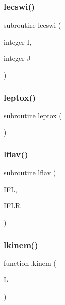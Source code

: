\subsubsection{\texorpdfstring{lecswi()}{lecswi()}}
{\footnotesize\ttfamily subroutine lecswi (\begin{DoxyParamCaption}\item[{integer}]{I,  }\item[{integer}]{J }\end{DoxyParamCaption})}

\mbox{\label{djangoh__l_8f_a11067b9bff6d66852c24584cdc303b3c}} 
\subsubsection{\texorpdfstring{leptox()}{leptox()}}
{\footnotesize\ttfamily subroutine leptox (\begin{DoxyParamCaption}{ }\end{DoxyParamCaption})}

\mbox{\label{djangoh__l_8f_a2f0e84e9b484d85d15f8ac53db3fc90c}} 
\subsubsection{\texorpdfstring{lflav()}{lflav()}}
{\footnotesize\ttfamily subroutine lflav (\begin{DoxyParamCaption}\item[{}]{I\+FL,  }\item[{}]{I\+F\+LR }\end{DoxyParamCaption})}

\mbox{\label{djangoh__l_8f_a504b2325591f13f341edbbbf8cc70bfa}} 
\subsubsection{\texorpdfstring{lkinem()}{lkinem()}}
{\footnotesize\ttfamily function lkinem (\begin{DoxyParamCaption}\item[{}]{L }\end{DoxyParamCaption})}

